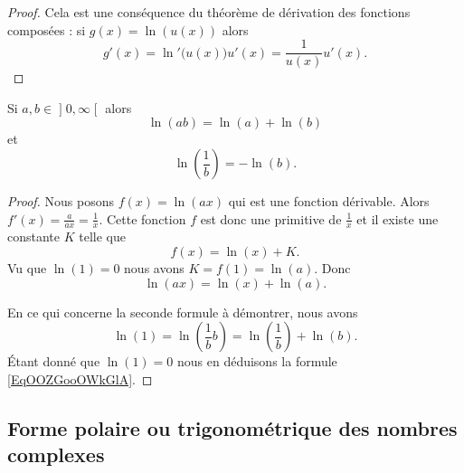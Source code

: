 \begin{proof}
    Cela est une conséquence du théorème de dérivation des fonctions composées : si \( g(x)=\ln(u(x))\) alors
    \begin{equation}
        g'(x)=\ln'\big( u(x) \big)u'(x)=\frac{1}{ u(x) }u'(x).
    \end{equation}
\end{proof}

\begin{lemma}   \label{LemPEYJooEZlueU}
Si \( a,b\in\mathopen] 0 , \infty \mathclose[\) alors
    \begin{equation}
        \ln(ab)=\ln(a)+\ln(b)
    \end{equation}
    et
    \begin{equation}    \label{EqOOZGooOWkGlA}
        \ln\left( \frac{1}{ b } \right)=-\ln(b).
    \end{equation}
\end{lemma}

\begin{proof}
    Nous posons \( f(x)=\ln(ax)\) qui est une fonction dérivable. Alors \( f'(x)=\frac{ a }{ ax }=\frac{1}{ x }\). Cette fonction \( f\) est donc une primitive de \( \frac{1}{ x }\) et il existe une constante \( K\) telle que
    \begin{equation}
        f(x)=\ln(x)+K.
    \end{equation}
    Vu que \( \ln(1)=0\) nous avons \( K=f(1)= \ln(a)\). Donc
    \begin{equation}
        \ln(ax)=\ln(x)+\ln(a).
    \end{equation}

    En ce qui concerne la seconde formule à démontrer, nous avons
    \begin{equation}
        \ln(1)=\ln\left( \frac{1}{ b }b \right)=\ln\left( \frac{1}{ b } \right)+\ln(b).
    \end{equation}
    Étant donné que $\ln(1)=0$ nous en déduisons la formule \eqref{EqOOZGooOWkGlA}.
\end{proof}

\subsection{Forme polaire ou trigonométrique des nombres complexes}

